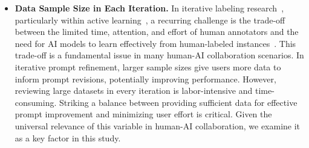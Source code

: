 \begin{itemize}
    \item 



\textbf{Data Sample Size in Each Iteration.}
In iterative labeling research~\cite{lee2024clarify}, particularly within active learning~\cite{bernard2018vial}, a recurring challenge is the trade-off between the limited time, attention, and effort of human annotators and the need for AI models to learn effectively from human-labeled instances~\cite{pandey2022modeling,wang2016human}. 
This trade-off is a fundamental issue in many human-AI collaboration scenarios. 
In iterative prompt refinement, larger sample sizes give users more data to inform prompt revisions, potentially improving performance. 
However, reviewing large datasets in every iteration is labor-intensive and time-consuming. 
Striking a balance between providing sufficient data for effective prompt improvement and minimizing user effort is critical. 
Given the universal relevance of this variable in human-AI collaboration, we examine it as a key factor in this study.


\end{itemize}
